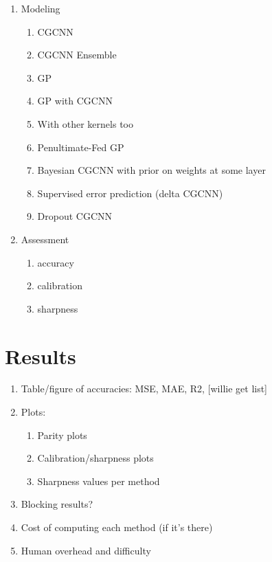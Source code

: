 \documentclass[]{achemso}
\begin{document}
\begin{enumerate}
    \item{Modeling}
        \begin{enumerate}
            \item{CGCNN}
            \item{CGCNN Ensemble}
            \item{GP}
            \item{GP with CGCNN}
            \item{With other kernels too}
            \item{Penultimate-Fed GP}
            \item{Bayesian CGCNN with prior on weights at some layer}
            \item{Supervised error prediction (delta CGCNN)}
            \item{Dropout CGCNN}
        \end{enumerate}
    \item{Assessment}
        \begin{enumerate}
            \item{accuracy}
            \item{calibration}
            \item{sharpness}
        \end{enumerate}
\end{enumerate}



\section{Results}

\begin{enumerate}
    \item{Table/figure of accuracies: MSE, MAE, R2, [willie get list]}
    \item{Plots:}
        \begin{enumerate}
            \item{Parity plots}
            \item{Calibration/sharpness plots}
            \item{Sharpness values per method}
        \end{enumerate}
    \item{Blocking results?}
    \item{Cost of computing each method (if it’s there)}
    \item{Human overhead and difficulty}
\end{enumerate}
\end{document}
